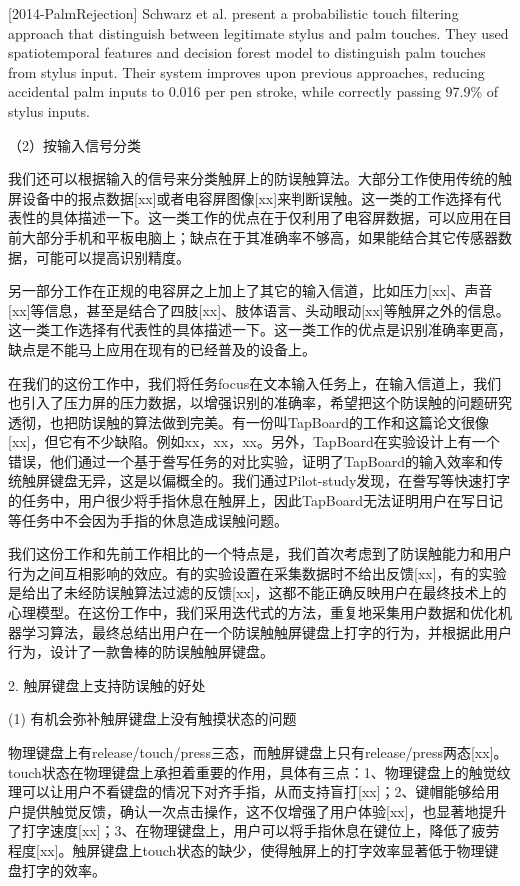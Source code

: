 [2014-PalmRejection]
Schwarz et al. present a probabilistic touch filtering approach that distinguish between legitimate stylus and palm touches. They used spatiotemporal features and decision forest model to distinguish palm touches from stylus input. Their system improves upon previous approaches, reducing accidental palm inputs to 0.016 per pen
stroke, while correctly passing 97.9\% of stylus inputs.


（2）按输入信号分类

我们还可以根据输入的信号来分类触屏上的防误触算法。大部分工作使用传统的触屏设备中的报点数据[xx]或者电容屏图像[xx]来判断误触。这一类的工作选择有代表性的具体描述一下。这一类工作的优点在于仅利用了电容屏数据，可以应用在目前大部分手机和平板电脑上；缺点在于其准确率不够高，如果能结合其它传感器数据，可能可以提高识别精度。

另一部分工作在正规的电容屏之上加上了其它的输入信道，比如压力[xx]、声音[xx]等信息，甚至是结合了四肢[xx]、肢体语言、头动眼动[xx]等触屏之外的信息。这一类工作选择有代表性的具体描述一下。这一类工作的优点是识别准确率更高，缺点是不能马上应用在现有的已经普及的设备上。

在我们的这份工作中，我们将任务focus在文本输入任务上，在输入信道上，我们也引入了压力屏的压力数据，以增强识别的准确率，希望把这个防误触的问题研究透彻，也把防误触的算法做到完美。有一份叫TapBoard的工作和这篇论文很像[xx]，但它有不少缺陷。例如xx，xx，xx。另外，TapBoard在实验设计上有一个错误，他们通过一个基于誊写任务的对比实验，证明了TapBoard的输入效率和传统触屏键盘无异，这是以偏概全的。我们通过Pilot-study发现，在誊写等快速打字的任务中，用户很少将手指休息在触屏上，因此TapBoard无法证明用户在写日记等任务中不会因为手指的休息造成误触问题。

我们这份工作和先前工作相比的一个特点是，我们首次考虑到了防误触能力和用户行为之间互相影响的效应。有的实验设置在采集数据时不给出反馈[xx]，有的实验是给出了未经防误触算法过滤的反馈[xx]，这都不能正确反映用户在最终技术上的心理模型。在这份工作中，我们采用迭代式的方法，重复地采集用户数据和优化机器学习算法，最终总结出用户在一个防误触触屏键盘上打字的行为，并根据此用户行为，设计了一款鲁棒的防误触触屏键盘。

2. 触屏键盘上支持防误触的好处

(1) 有机会弥补触屏键盘上没有触摸状态的问题

物理键盘上有release/touch/press三态，而触屏键盘上只有release/press两态[xx]。touch状态在物理键盘上承担着重要的作用，具体有三点：1、物理键盘上的触觉纹理可以让用户不看键盘的情况下对齐手指，从而支持盲打[xx]；2、键帽能够给用户提供触觉反馈，确认一次点击操作，这不仅增强了用户体验[xx]，也显著地提升了打字速度[xx]；3、在物理键盘上，用户可以将手指休息在键位上，降低了疲劳程度[xx]。触屏键盘上touch状态的缺少，使得触屏上的打字效率显著低于物理键盘打字的效率。

